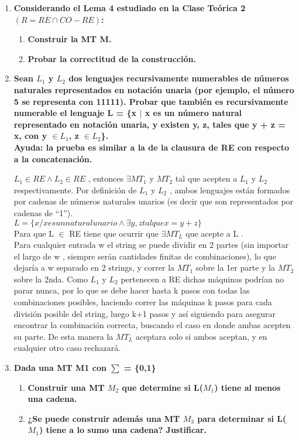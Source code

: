 \documentclass{article}
\begin{document}
\begin{enumerate}
\item \textbf{Considerando el Lema 4 estudiado en la Clase Teórica 2 $(R = RE \cap CO-RE)$:}

\begin{enumerate}
\item \textbf{ Construir la MT M.}
\item \textbf{Probar la correctitud de la construcción.} 
\end{enumerate}

\item \textbf{Sean $L_1$ y $L_2$ dos lenguajes recursivamente numerables de números naturales
representados en notación unaria (por ejemplo, el número 5 se representa con 11111). Probar
que también es recursivamente numerable el lenguaje L = \{x $\mid$ x es un número natural
representado en notación unaria, y existen y, z, tales que y + z = x, con y $\in L_1$, z $\in L_2$\}.\\}
\textbf{Ayuda: la prueba es similar a la de la clausura de RE con respecto a la concatenación. }
 
$L_1 \in RE \wedge L_2 \in RE$ , entonces $ \exists MT_1$ y $MT_2$ tal que acepten a $L_1$ y $L_2$ respectivamente. Por
definición de $L_1$ y $L_2$ , ambos lenguajes están formados por cadenas de números naturales unarios (es
decir que son representados por cadenas de “1”).\\
$L = \{ x / x es un natural unario \wedge \exists y, z tal que x = y + z \}$\\

Para que L $\in$ RE tiene que ocurrir que $\exists MT_L$ que acepte a L .\\
Para cualquier entrada w el string se puede dividir en 2 partes (sin importar el largo de w ,
siempre serán cantidades finitas de combinaciones), lo que dejaría a w separado en 2 strings, y correr la
$MT_1$ sobre la 1er parte y la $MT_2$ sobre la 2nda. Como $L_1$ y $L_2$ pertenecen a RE dichas máquinas
podrían no parar nunca, por lo que se debe hacer hasta k pasos con todas las combinaciones posibles,
haciendo correr las máquinas k pasos para cada división posible del string, luego k+1 pasos y así
siguiendo para asegurar encontrar la combinación correcta, buscando el caso en donde ambas acepten
su parte. De esta manera la $MT_L$ aceptara solo si ambos aceptan, y en cualquier otro caso rechazará.

\item \textbf{ Dada una MT M1 con $\sum$ = \{0,1\} }

\begin{enumerate}
\item \textbf{ Construir una MT $M_2$ que determine si L($M_1$) tiene al menos una cadena.}
\item \textbf{ ¿Se puede construir además una MT $M_3$ para determinar si L($M_1$) tiene a lo sumo una
cadena? Justificar.
}
\end{enumerate}


\end{enumerate}
\end{document}
